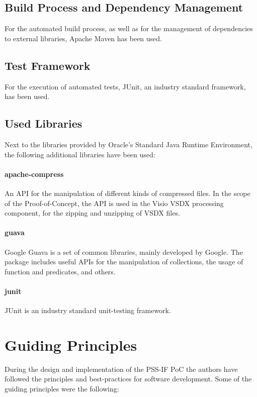\subsection{Build Process and Dependency Management}

For the automated build process, as well as for the management of dependencies to external libraries, Apache Maven has been used.

\subsection{Test Framework}

For the execution of automated tests, JUnit, an industry standard framework, has been used.

\subsection{Used Libraries}

Next to the libraries provided by Oracle's Standard Java Runtime Environment, the following additional libraries have been used:

\paragraph{apache-compress} An API for the manipulation of different kinds of compressed files. In the scope of the Proof-of-Concept, the API is used in the Visio VSDX processing component, for the zipping and unzipping of VSDX files.

\paragraph{guava} Google Guava is a set of common libraries, mainly developed by Google. The package includes useful APIs for the manipulation of collections, the usage of function and predicates, and others.

\paragraph{junit} JUnit is an industry standard unit-testing framework.

\section{Guiding Principles}
\label{sec:impl:principles}

During the design and implementation of the PSS-IF PoC the authors have followed the principles and best-practices for software development. Some of the guiding principles were the following:

